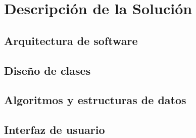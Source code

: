 \chapter{Descripción de la Solución}


\section{Arquitectura de software}

\section{Diseño de clases}

\section{Algoritmos y estructuras de datos}

\section{Interfaz de usuario}